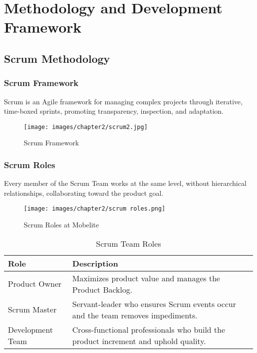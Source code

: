 \chapter{Methodology and Development Framework}

\section{Scrum Methodology}

\subsection{Scrum Framework}

Scrum is an Agile framework for managing complex projects through iterative, time-boxed sprints, promoting transparency, inspection, and adaptation.

\begin{figure}[H]
\centering
\texttt{[image: images/chapter2/scrum2.jpg]}
\caption{Scrum Framework}
\label{fig:scrum-framework}
\end{figure}

\subsection{Scrum Roles}

Every member of the Scrum Team works at the same level, without hierarchical relationships, collaborating toward the product goal.

\begin{figure}[H]
\centering
\texttt{[image: images/chapter2/scrum roles.png]}
\caption{Scrum Roles at Mobelite}
\label{fig:scrum-roles}
\end{figure}

\begin{table}[H]
\centering
\begin{tabular}{|p{}|p{}|}
\hline
\textbf{Role} & \textbf{Description} \\
\hline
Product Owner & Maximizes product value and manages the Product Backlog. \\
\hline
Scrum Master & Servant-leader who ensures Scrum events occur and the team removes impediments. \\
\hline
Development Team & Cross-functional professionals who build the product increment and uphold quality. \\
\hline
\end{tabular}
\caption{Scrum Team Roles}
\label{tab:scrum-team}
\end{table}

